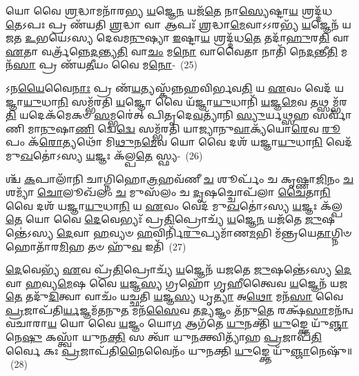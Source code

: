 {\anuvakamend[{𑌪𑌰𑌿᳴ 𑌮\-\ul{𑌨𑍁}\-𑌷𑍍𑌯𑌾᳴ 𑌇\-\ul{𑌨𑍍𑌦𑍍𑌰𑌿}\-𑌯𑍞 \ul{𑌸𑌾}\-𑌕𑍍𑌷𑌾𑌤𑍍 𑌤𑍍𑌰𑍀𑌣𑌿᳴ 𑌚}]}%

𑌯𑍋 𑌵𑍈 \ul{𑌶𑍍𑌰}\-𑌦𑍍𑌧𑌾𑌮𑌨𑌾᳴𑌰𑌭𑍍𑌯 \ul{𑌯}\-𑌜𑍍𑌞𑍇\-\ul{𑌨} 𑌯𑌜᳴\-\ul{𑌤𑍇} 𑌨𑌾\-\ul{𑌸𑍍𑌯𑍇}\-𑌷𑍍𑌟𑌾\-\ul{𑌯} 𑌶𑍍𑌰𑌦𑍍𑌦᳴𑌧\-\ul{𑌤𑍇}\-\-𑌽𑌪𑌃 𑌪𑍍𑌰 𑌣᳴𑌯𑌤𑌿 \ul{𑌶𑍍𑌰}\-𑌦𑍍𑌧𑌾 𑌵𑌾 𑌆𑌪𑌃᳴ \ul{𑌶𑍍𑌰}\-𑌦𑍍𑌧𑌾\-\ul{𑌮𑍇}\-𑌵𑌾\-𑌽\-𑌽𑌰𑌭𑍍𑌯᳴ \ul{𑌯}\-𑌜𑍍𑌞𑍇𑌨᳴ 𑌯𑌜𑌤 \ul{𑌉}\-𑌭𑌯𑍇॑\-𑌽𑌸𑍍𑌯 𑌦𑍇𑌵𑌮\-\ul{𑌨𑍁}\-𑌷𑍍𑌯𑌾 \ul{𑌇}\-𑌷𑍍𑌟𑌾\-\ul{𑌯} 𑌶𑍍𑌰𑌦𑍍𑌦᳴𑌧\-\ul{𑌤𑍇} 𑌤𑌦𑌾᳴\-\ul{𑌹𑍁}\-𑌰\-\ul{𑌤𑌿} 𑌵𑌾 \ul{𑌏}\-𑌤𑌾 𑌵𑌰𑍍𑌤𑍍𑌰᳴𑌨𑍍𑌨𑍇\-\ul{𑌦}\-𑌨𑍍𑌤𑍍𑌯\-\ul{𑌤𑌿} 𑌵𑌾\-\ul{𑌚𑌂} 𑌮\-\ul{𑌨𑍋} 𑌵𑌾𑌵𑍈𑌤𑌾 𑌨𑌾𑌤𑌿᳴ 𑌨𑍇\-\ul{𑌦}\-𑌨𑍍𑌤𑍀\-\ul{𑌤𑌿} 𑌮𑌨᳴\-\ul{𑌸𑌾} 𑌪𑍍𑌰 𑌣᳴𑌯\-\ul{𑌤𑍀}\-𑌯𑌂 𑌵𑍈 𑌮\-\ul{𑌨𑍋}\--~(25)

𑌽𑌨\-\ul{𑌯𑍈}\-𑌵𑍈\-\ul{𑌨𑌾𑌃} 𑌪𑍍𑌰 𑌣᳴\-\ul{𑌯}\-𑌤𑍍𑌯𑌸𑍍𑌕᳴𑌨𑍍𑌨𑌹𑌵𑌿𑌰𑍍𑌭𑌵\-\ul{𑌤𑌿} 𑌯 \ul{𑌏}\-𑌵𑌂 𑌵𑍇𑌦᳴ 𑌯𑌜𑍍𑌞𑌾\-\ul{𑌯𑍁}\-𑌧𑌾\-\ul{𑌨𑌿} 𑌸𑌮𑍍𑌭᳴𑌰𑌤𑌿 \ul{𑌯}\-𑌜𑍍𑌞𑍋 𑌵𑍈 𑌯᳴𑌜𑍍𑌞𑌾\-\ul{𑌯𑍁}\-𑌧𑌾𑌨𑌿᳴ \ul{𑌯}\-𑌜𑍍𑌞\-\ul{𑌮𑍇}\-𑌵 𑌤𑌥𑍍𑌸𑌮𑍍𑌭᳴𑌰\-\ul{𑌤𑌿} 𑌯𑌦𑍇𑌕᳴𑌮𑍇𑌕𑍞 \ul{𑌸}\-𑌮𑍍𑌭𑌰𑍇॑𑌤𑍍 𑌪𑌿𑌤𑍃𑌦𑍇\-\ul{𑌵}\-𑌤𑍍𑌯𑌾᳴𑌨𑌿 \ul{𑌸𑍍𑌯𑍁}\-𑌰𑍍𑌯\-\ul{𑌥𑍍𑌸}\-𑌹 𑌸𑌰𑍍𑌵𑌾᳴𑌣𑌿 𑌮𑌾\-\ul{𑌨𑍁}\-𑌷𑌾\-\ul{𑌣𑌿} 𑌦𑍍𑌵𑍇\-\ul{𑌦𑍍𑌵𑍇} 𑌸𑌮𑍍𑌭᳴𑌰𑌤𑌿 𑌯𑌾𑌜𑍍𑌯𑌾𑌨𑍁\-\ul{𑌵𑌾}\-𑌕𑍍𑌯᳴𑌯𑍋\-\ul{𑌰𑍇}\-𑌵 \ul{𑌰𑍂}\-𑌪𑌂 𑌕᳴\-\ul{𑌰𑍋}\-𑌤𑍍𑌯𑌥𑍋᳴ 𑌮𑌿\-\ul{𑌥𑍁}\-𑌨\-\ul{𑌮𑍇}\-𑌵 𑌯𑍋 𑌵𑍈 𑌦𑌶᳴ 𑌯𑌜𑍍𑌞𑌾\-\ul{𑌯𑍁}\-𑌧𑌾\-\ul{𑌨𑌿} 𑌵𑍇𑌦᳴ 𑌮𑍁\-\ul{𑌖}\-𑌤𑍋॑\-𑌽𑌸𑍍𑌯 \ul{𑌯}\-𑌜𑍍𑌞𑌃 𑌕᳴𑌲𑍍𑌪\-\ul{𑌤𑍇} 𑌸𑍍𑌫𑍍𑌯-~(26)

𑌶𑍍𑌚᳴ \ul{𑌕}\-𑌪𑌾𑌲𑌾᳴𑌨𑌿 𑌚𑌾𑌗𑍍𑌨𑌿𑌹𑍋\-\ul{𑌤𑍍𑌰}\-𑌹𑌵᳴𑌣𑍀 \ul{𑌚} 𑌶𑍂𑌰𑍍𑌪𑌂᳴ 𑌚 𑌕𑍃𑌷𑍍𑌣𑌾\-\ul{𑌜𑌿}\-𑌨𑌂 \ul{𑌚} 𑌶𑌮𑍍𑌯𑌾᳴ \ul{𑌚𑍋}\-𑌲𑍂𑌖᳴𑌲𑌂 \ul{𑌚} 𑌮𑍁𑌸᳴𑌲𑌂 𑌚 \ul{𑌦𑍃}\-𑌷𑌚𑍍𑌚𑍋𑌪᳴𑌲𑌾 \ul{𑌚𑍈}\-𑌤𑌾\-\ul{𑌨𑌿} 𑌵𑍈 𑌦𑌶᳴ 𑌯𑌜𑍍𑌞𑌾\-\ul{𑌯𑍁}\-𑌧𑌾\-\ul{𑌨𑌿} 𑌯 \ul{𑌏}\-𑌵𑌂 𑌵𑍇𑌦᳴ 𑌮𑍁\-\ul{𑌖}\-𑌤𑍋॑\-𑌽𑌸𑍍𑌯 \ul{𑌯}\-𑌜𑍍𑌞𑌃 𑌕᳴𑌲𑍍𑌪\-\ul{𑌤𑍇} 𑌯𑍋 𑌵𑍈 \ul{𑌦𑍇}\-𑌵𑍇𑌭𑍍𑌯𑌃᳴ 𑌪𑍍𑌰\-\ul{𑌤𑌿}\-𑌪𑍍𑌰𑍋𑌚𑍍𑌯᳴ \ul{𑌯}\-𑌜𑍍𑌞𑍇\-\ul{𑌨} 𑌯𑌜᳴𑌤𑍇 \ul{𑌜𑍁}\-𑌷𑌨𑍍𑌤𑍇॑\-𑌽𑌸𑍍𑌯 \ul{𑌦𑍇}\-𑌵𑌾 \ul{𑌹}\-𑌵𑍍𑌯𑍞 \ul{𑌹}\-𑌵𑌿𑌰𑍍𑌨𑌿᳴\-\ul{𑌰𑍁}\-𑌪𑍍𑌯𑌮𑌾᳴𑌣\-\ul{𑌮}\-𑌭𑌿 𑌮᳴𑌨𑍍𑌤𑍍𑌰𑌯𑍇\-\ul{𑌤𑌾}\-𑌗𑍍𑌨𑌿𑍞 𑌹𑍋𑌤𑌾᳴𑌰\-\ul{𑌮𑌿}\-𑌹 𑌤𑍞 𑌹𑍁᳴\-\ul{𑌵} 𑌇𑌤𑌿᳴~(27)

\-\ul{𑌦𑍇}\-𑌵𑍇𑌭𑍍𑌯᳴ \ul{𑌏}\-𑌵 𑌪𑍍𑌰᳴\-\ul{𑌤𑌿}\-𑌪𑍍𑌰𑍋𑌚𑍍𑌯᳴ \ul{𑌯}\-𑌜𑍍𑌞𑍇𑌨᳴ 𑌯𑌜𑌤𑍇 \ul{𑌜𑍁}\-𑌷𑌨𑍍𑌤𑍇॑\-𑌽𑌸𑍍𑌯 \ul{𑌦𑍇}\-𑌵𑌾 \ul{𑌹}\-𑌵𑍍𑌯\-\ul{𑌮𑍇}\-𑌷 𑌵𑍈 \ul{𑌯}\-𑌜𑍍𑌞\-\ul{𑌸𑍍𑌯} 𑌗𑍍𑌰𑌹𑍋᳴ 𑌗𑍃\-\ul{𑌹𑍀}\-𑌤𑍍𑌵𑍈𑌵 \ul{𑌯}\-𑌜𑍍𑌞𑍇𑌨᳴ 𑌯𑌜\-\ul{𑌤𑍇} 𑌤𑌦𑍁᳴\-\ul{𑌦𑌿}\-𑌤𑍍𑌵𑌾 𑌵𑌾𑌚𑌂᳴ 𑌯𑌚𑍍𑌛𑌤𑌿 \ul{𑌯}\-𑌜𑍍𑌞\-\ul{𑌸𑍍𑌯} 𑌧𑍃\-\ul{𑌤𑍍𑌯𑌾} 𑌅\-\ul{𑌥𑍋} 𑌮𑌨᳴\-\ul{𑌸𑌾} 𑌵𑍈 \ul{𑌪𑍍𑌰}\-𑌜𑌾𑌪᳴𑌤𑌿\-\ul{𑌰𑍍𑌯}\-𑌜𑍍𑌞𑌮᳴𑌤𑌨𑍁\-\ul{𑌤} 𑌮𑌨᳴\-\ul{𑌸𑍈}\-𑌵 𑌤\-\ul{𑌦𑍍𑌯}\-𑌜𑍍𑌞𑌂 𑌤᳴𑌨𑍁\-\ul{𑌤𑍇} 𑌰𑌕𑍍𑌷᳴\-\ul{𑌸𑌾}\-𑌮𑌨᳴𑌨𑍍𑌵𑌵𑌚𑌾𑌰𑌾\-\ul{𑌯} 𑌯𑍋 𑌵𑍈 \ul{𑌯}\-𑌜𑍍𑌞𑌂 𑌯𑍋\-\ul{𑌗} 𑌆𑌗᳴𑌤𑍇 \ul{𑌯𑍁}\-𑌨𑌕𑍍𑌤𑌿᳴ \ul{𑌯𑍁}\-𑌙𑍍𑌕𑍍𑌤𑍇 𑌯𑍁᳴\-\ul{𑌞𑍍𑌜𑌾}\-𑌨𑍇\-\ul{𑌷𑍁} 𑌕𑌸𑍍𑌤𑍍𑌵𑌾᳴ 𑌯𑍁𑌨\-\ul{𑌕𑍍𑌤𑌿} 𑌸 𑌤𑍍𑌵𑌾᳴ 𑌯𑍁\-\ul{𑌨}\-𑌕𑍍𑌤𑍍𑌵𑌿𑌤𑍍𑌯𑌾᳴𑌹 \ul{𑌪𑍍𑌰}\-𑌜𑌾𑌪᳴\-\ul{𑌤𑌿}\-𑌰𑍍𑌵𑍈 𑌕𑌃 \ul{𑌪𑍍𑌰}\-𑌜𑌾𑌪᳴𑌤𑌿\-\ul{𑌨𑍈}\-𑌵𑍈𑌨𑌂᳴ 𑌯𑍁𑌨𑌕𑍍𑌤𑌿 \ul{𑌯𑍁}\-𑌙𑍍𑌕𑍍𑌤𑍇 𑌯𑍁᳴\-\ul{𑌞𑍍𑌜𑌾}\-𑌨𑍇𑌷𑍁᳴॥~(28)

{\anuvakamend[{𑌵𑍈 𑌮\-\ul{𑌨𑌃} 𑌸𑍍𑌫𑍍𑌯 𑌇𑌤𑌿᳴ 𑌯𑍁\-\ul{𑌨}\-𑌕𑍍𑌤𑍍𑌵𑍇𑌕𑌾᳴\-𑌦𑌶 𑌚}]}%

